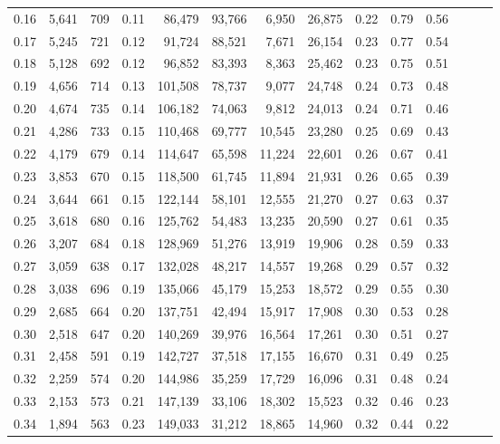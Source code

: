 \begin{tabular}{rrrrrrrrrrrrrr}
0.16 &  5,641 &  709 &  0.11 &   86,479 &   93,766 &   6,950 &  26,875 &  0.22 &  0.79 &      0.56 \\
0.17 &  5,245 &  721 &  0.12 &   91,724 &   88,521 &   7,671 &  26,154 &  0.23 &  0.77 &      0.54 \\
0.18 &  5,128 &  692 &  0.12 &   96,852 &   83,393 &   8,363 &  25,462 &  0.23 &  0.75 &      0.51 \\
0.19 &  4,656 &  714 &  0.13 &  101,508 &   78,737 &   9,077 &  24,748 &  0.24 &  0.73 &      0.48 \\
0.20 &  4,674 &  735 &  0.14 &  106,182 &   74,063 &   9,812 &  24,013 &  0.24 &  0.71 &      0.46 \\
0.21 &  4,286 &  733 &  0.15 &  110,468 &   69,777 &  10,545 &  23,280 &  0.25 &  0.69 &      0.43 \\
0.22 &  4,179 &  679 &  0.14 &  114,647 &   65,598 &  11,224 &  22,601 &  0.26 &  0.67 &      0.41 \\
0.23 &  3,853 &  670 &  0.15 &  118,500 &   61,745 &  11,894 &  21,931 &  0.26 &  0.65 &      0.39 \\
0.24 &  3,644 &  661 &  0.15 &  122,144 &   58,101 &  12,555 &  21,270 &  0.27 &  0.63 &      0.37 \\
0.25 &  3,618 &  680 &  0.16 &  125,762 &   54,483 &  13,235 &  20,590 &  0.27 &  0.61 &      0.35 \\
0.26 &  3,207 &  684 &  0.18 &  128,969 &   51,276 &  13,919 &  19,906 &  0.28 &  0.59 &      0.33 \\
0.27 &  3,059 &  638 &  0.17 &  132,028 &   48,217 &  14,557 &  19,268 &  0.29 &  0.57 &      0.32 \\
0.28 &  3,038 &  696 &  0.19 &  135,066 &   45,179 &  15,253 &  18,572 &  0.29 &  0.55 &      0.30 \\
0.29 &  2,685 &  664 &  0.20 &  137,751 &   42,494 &  15,917 &  17,908 &  0.30 &  0.53 &      0.28 \\
0.30 &  2,518 &  647 &  0.20 &  140,269 &   39,976 &  16,564 &  17,261 &  0.30 &  0.51 &      0.27 \\
0.31 &  2,458 &  591 &  0.19 &  142,727 &   37,518 &  17,155 &  16,670 &  0.31 &  0.49 &      0.25 \\
0.32 &  2,259 &  574 &  0.20 &  144,986 &   35,259 &  17,729 &  16,096 &  0.31 &  0.48 &      0.24 \\
0.33 &  2,153 &  573 &  0.21 &  147,139 &   33,106 &  18,302 &  15,523 &  0.32 &  0.46 &      0.23 \\
0.34 &  1,894 &  563 &  0.23 &  149,033 &   31,212 &  18,865 &  14,960 &  0.32 &  0.44 &      0.22 \\

\end{tabular}
